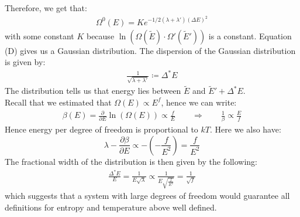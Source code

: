 \documentclass[11pt,oneside]{book}
\theoremstyle{break}
\theoremstyle{break}
\begin{document}
Therefore, we get that: 
\begin{align*}
\Omega^0(E) = K e^{-1/2(\lambda+\lambda')(\Delta E)^2} \tag{D}
\end{align*}
with some constant $K$ because $\ln(\Omega(\widetilde{E})\cdot \Omega'(\widetilde{E}'))$ is a constant. Equation (D) gives us a Gaussian distribution. The dispersion of the Gaussian distribution is given by:
\begin{align*}
\frac{1}{\sqrt{\lambda+\lambda'}} \coloneqq \Delta^* E
\end{align*}
The distribution tells us that energy lies between $\widetilde{E}$ and $\widetilde{E}' + \Delta^* E$.\\ 
Recall that we estimated that $\Omega(E) \propto E^f$, hence we can write:
\begin{align*}
\beta(E) = \frac{\partial }{\partial E}\ln(\Omega(E)) \propto \frac{f}{E}\qquad\Rightarrow\qquad \frac{1}{\beta} \propto \frac{E}{f}
\end{align*}
Hence energy per degree of freedom is proportional to $kT$. Here we also have:
$$\lambda - \frac{\partial \beta}{\partial E} \propto -\left(-\frac{f}{E^2}\right) = \frac{f}{E^2}$$
The fractional width of the distribution is then given by the following:
\begin{align*}
\frac{\Delta^*E}{E}=\frac{1}{E\sqrt{\lambda}} \propto  \frac{1}{E\sqrt{\frac{f}{E^2}}} = \frac{1}{\sqrt{f}}
\end{align*}
which suggests that a system with large degrees of freedom would guarantee all definitions for entropy and temperature above well defined. 

\newpage
\end{document}
